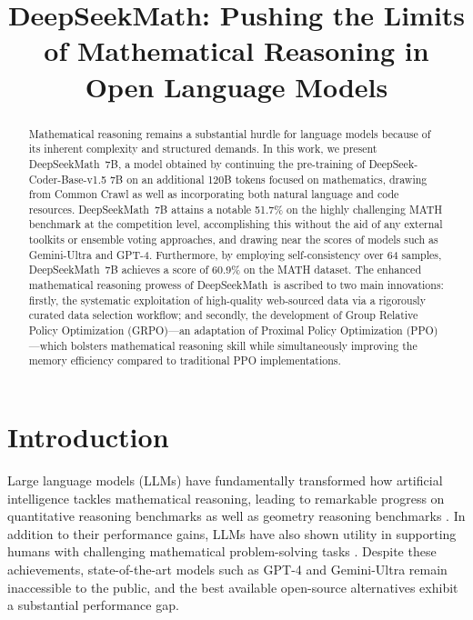 \title{DeepSeekMath: Pushing the Limits of Mathematical Reasoning in Open Language Models}

\begin{abstract}
Mathematical reasoning remains a substantial hurdle for language models because of its inherent complexity and structured demands. In this work, we present DeepSeekMath~7B, a model obtained by continuing the pre-training of DeepSeek-Coder-Base-v1.5 7B on an additional 120B tokens focused on mathematics, drawing from Common Crawl as well as incorporating both natural language and code resources. DeepSeekMath~7B attains a notable 51.7\% on the highly challenging MATH benchmark at the competition level, accomplishing this without the aid of any external toolkits or ensemble voting approaches, and drawing near the scores of models such as Gemini-Ultra and GPT-4. Furthermore, by employing self-consistency over 64 samples, DeepSeekMath~7B achieves a score of 60.9\% on the MATH dataset. The enhanced mathematical reasoning prowess of DeepSeekMath~is ascribed to two main innovations: firstly, the systematic exploitation of high-quality web-sourced data via a rigorously curated data selection workflow; and secondly, the development of Group Relative Policy Optimization (GRPO)—an adaptation of Proximal Policy Optimization (PPO)—which bolsters mathematical reasoning skill while simultaneously improving the memory efficiency compared to traditional PPO implementations.
\end{abstract}

\section{Introduction}

Large language models (LLMs) have fundamentally transformed how artificial intelligence tackles mathematical reasoning, leading to remarkable progress on quantitative reasoning benchmarks \citep{MATH} as well as geometry reasoning benchmarks \citep{trinh2024solving}. In addition to their performance gains, LLMs have also shown utility in supporting humans with challenging mathematical problem-solving tasks \citep{tao}. Despite these achievements, state-of-the-art models such as GPT-4 \citep{gpt4} and Gemini-Ultra \citep{gemini} remain inaccessible to the public, and the best available open-source alternatives exhibit a substantial performance gap.

